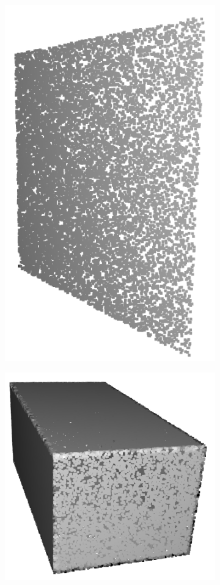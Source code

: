 \begin{figure}
    \begin{subfigure}{.48\linewidth}
    \centering
    \includegraphics[scale=0.5]{Img/06_plane0.png}
    \end{subfigure}
    \begin{subfigure}{.48\linewidth}
    \centering
    \includegraphics[scale=0.5]{Img/06_room0.png}

\end{subfigure}
\end{figure}
